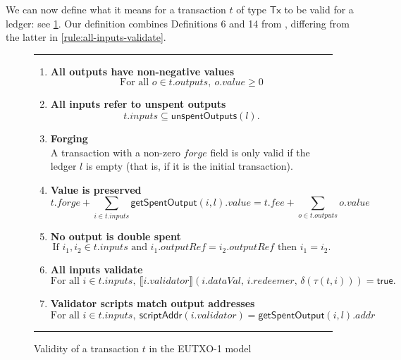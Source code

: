 \documentclass[a4paper]{article}
\newcommand{\todokwxm}[1]{\todo[inline,color=blue!20,author=kwxm]{#1}}
\newcommand{\msf}[1]{\ensuremath{\mathsf{#1}}}
\newcommand{\mi}[1]{\ensuremath{\mathit{#1}}}
\newcommand\rfskip{7pt}
\newenvironment{ruledfigure}[1]{\begin{figure}[#1]\hrule\vspace{\rfskip}}{\vspace{\rfskip}\hrule\end{figure}}
\newcommand{\true}{\textsf{true}}
\newcommand{\scriptAddr}{\msf{scriptAddr}}
\newcommand{\inputs}{\mi{inputs}}
\newcommand{\outputs}{\mi{outputs}}
\newcommand{\forge}{\mi{forge}}
\newcommand{\fee}{\mi{fee}}
\newcommand{\addr}{\mi{addr}}
\newcommand{\val}{\mi{value}}  %
\newcommand{\validator}{\mi{validator}}
\newcommand{\redeemer}{\mi{redeemer}}
\newcommand{\dataVal}{\mi{dataVal}}
\newcommand{\outputref}{\mi{outputRef}}
\newcommand{\getSpent}{\msf{getSpentOutput}}
\newcommand{\unspent}{\msf{unspentOutputs}}
\newcommand{\eutxotx}{\msf{Tx}}
\begin{document}
We can now define what it means for a transaction $t$ of
type $\eutxotx$ to be valid for a ledger: see
\cref{fig:eutxo-1-validity}.  Our definition combines
Definitions 6 and 14 from \citep{Zahnentferner18-UTxO}, differing from
the latter in \cref{rule:all-inputs-validate}.
\todokwxm{Check this.}

\begin{ruledfigure}{H}
\begin{enumerate}

\item
  \label{rule:all-outputs-are-non-negative}
  \textbf{All outputs have non-negative values}
  \begin{displaymath}
    \textrm{For all } o \in t.\outputs,\ o.\val \geq 0
  \end{displaymath}

\item
  \label{rule:all-inputs-refer-to-unspent-outputs}
  \textbf{All inputs refer to unspent outputs}
  \begin{displaymath}
    t.\inputs \subseteq \unspent(l).
  \end{displaymath}

\item
  \label{rule:forging}
  \textbf{Forging} \\
    A transaction with a non-zero \forge{}
    field is only valid if the ledger $l$ is empty (that
    is, if it is the initial transaction).

\item
  \label{rule:value-is-preserved}
  \textbf{Value is preserved}
  \begin{displaymath}
    t.\forge + \sum_{i \in t.\inputs} \getSpent(i, l).\val = t.\fee + \sum_{o \in t.\outputs} o.\val
  \end{displaymath}

\item
  \label{rule:no-double-spending}
  \textbf{No output is double spent}
  \begin{displaymath}
    \textrm{If } i_1, i_2 \in t.\inputs \textrm{ and }  i_1.\outputref = i_2.\outputref
    \textrm{ then } i_1 = i_2.
  \end{displaymath}

\item
  \label{rule:all-inputs-validate}
  \textbf{All inputs validate}
  \begin{displaymath}
    \textrm{For all } i \in t.\inputs,\ \llbracket
    i.\validator\rrbracket (i.\dataVal,\, i.\redeemer,\,  \delta(\tau(t,i))) = \true.
  \end{displaymath}

\item
  \label{rule:validator-scripts-hash}
  \textbf{Validator scripts match output addresses}
  \begin{displaymath}
    \textrm{For all } i \in t.\inputs,\ \scriptAddr(i.\validator) = \getSpent(i, l).\addr
  \end{displaymath}

\end{enumerate}
\caption{Validity of a transaction $t$ in the EUTXO-1 model}
\label{fig:eutxo-1-validity}
\end{ruledfigure}
\end{document}
